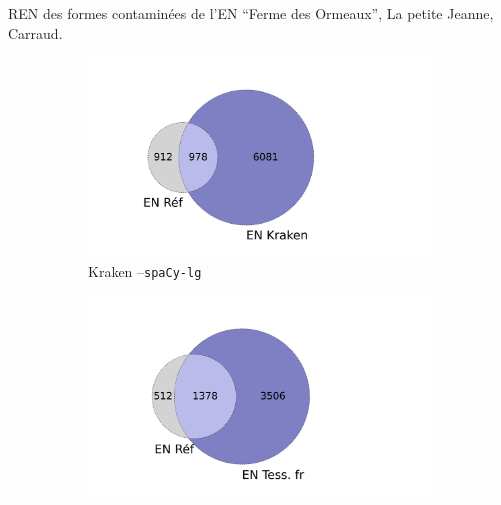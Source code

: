 \begin{table}[h!]
\small
    \centering
    
    \caption{REN des formes contaminées de l'EN ``Ferme des Ormeaux'', {\normalfont La petite Jeanne}, Carraud.}
    \label{tab:EN_contamines_Variantes}
\end{table}

\begin{figure}[h!]
    \begin{minipage}{7cm}
  \begin{subfigure}{1\textwidth}
  \includegraphics[width=1\textwidth]{IMAGES/INTERSECTIONS_GLOBALES/ELTeCFRA_Kraken_spacy-lg-concat_intersection.png} 
  \caption{Kraken --\texttt{spaCy-lg}}
  \label{fig:ELTeCFRA_Kraken_spacy-lg-concat_intersection}
  \end{subfigure}
  \end{minipage}
  \begin{minipage}{7cm}
  \begin{subfigure}{1\textwidth}
  \includegraphics[width=1\textwidth]{IMAGES/INTERSECTIONS_GLOBALES/ELTeCFRA_Tess. fr_spacy-lg-concat_intersection.png}

\end{subfigure}
\end{minipage}
\end{figure}
